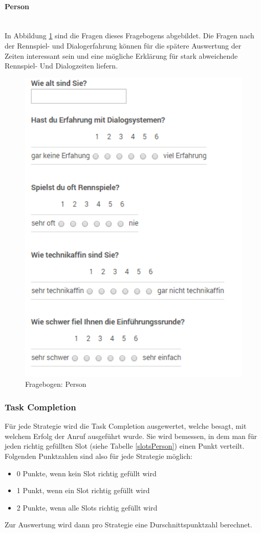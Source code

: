 \documentclass[12pt,a4paper]{scrartcl}
\begin{document}
\paragraph{Person}
~\\
In Abbildung \ref{fbperson} sind die Fragen dieses Fragebogens abgebildet.
Die Fragen nach der Rennspiel- und Dialogerfahrung können für die spätere Auswertung der Zeiten interessant sein und eine mögliche Erklärung für stark abweichende Rennspiel- Und Dialogzeiten liefern. 
\begin{figure}[htbp]
\begin{center}
\includegraphics[width=12cm]{fbperson.png}
\caption{Fragebogen: Person}
\label{fbperson}
\end{center}
\end{figure}

\subsubsection{Task Completion}
Für jede Strategie wird die Task Completion ausgewertet, welche besagt, mit welchem Erfolg der Anruf ausgeführt wurde. Sie wird bemessen, in dem man für jeden richtig gefüllten Slot (siehe Tabelle \ref{slotsPerson}) einen Punkt verteilt. Folgenden Punktzahlen sind also für jede Strategie möglich:
\begin{itemize}
\item 0 Punkte, wenn kein Slot richtig gefüllt wird
\item 1 Punkt, wenn ein Slot richtig gefüllt wird
\item 2 Punkte, wenn alle Slots richtig gefüllt wird
\end{itemize}
Zur Auswertung wird dann pro Strategie eine Durschnittspunktzahl berechnet. 
\end{document}

